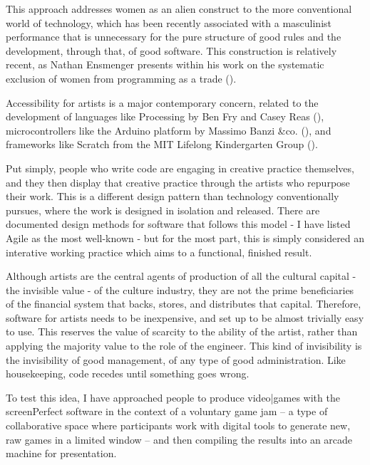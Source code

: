 This approach addresses women as an alien construct to the more conventional world of technology, which has been recently associated with a masculinist performance that is unnecessary for the pure structure of good rules and the development, through that, of good software. This construction is relatively recent, as Nathan Ensmenger presents within his work on the systematic exclusion of women from programming as a trade (\cite{ensmenger}).

Accessibility for artists is a major contemporary concern, related to the development of languages like Processing by Ben Fry and Casey Reas (\cite{processing}), microcontrollers like the Arduino platform by Massimo Banzi &co. (\cite{arduino}), and frameworks like Scratch from the MIT Lifelong Kindergarten Group (\cite{scratch}). 

Put simply, people who write code are engaging in creative practice themselves, and they then display that creative practice through the artists who repurpose their work. This is a different design pattern than technology conventionally pursues, where the work is designed in isolation and released. There are documented design methods for software that follows this model - I have listed Agile as the most well-known - but for the most part, this is simply considered an interative working practice which aims to a functional, finished result.

Although artists are the central agents of production of all the cultural capital - the invisible value - of the culture industry, they are not the prime beneficiaries of the financial system that backs, stores, and distributes that capital. Therefore, software for artists needs to be inexpensive, and set up to be almost trivially easy to use. This reserves the value of scarcity to the ability of the artist, rather than applying the majority value to the role of the engineer. This kind of invisibility is the invisibility of good management, of any type of good administration. Like housekeeping, code recedes until something goes wrong.

To test this idea, I have approached people to produce video|games with the screenPerfect software in the context of a voluntary game jam – a type of collaborative space where participants work with digital tools to generate new, raw games in a limited window – and then compiling the results into an arcade machine for presentation. 


